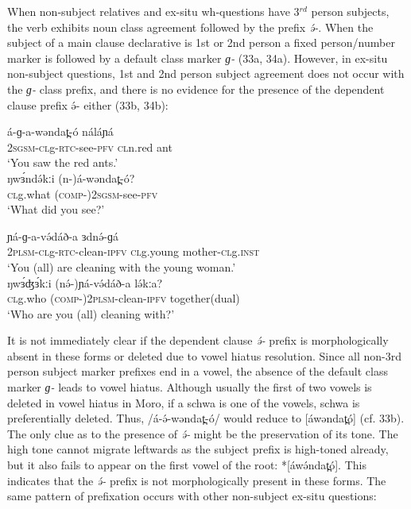 When non-subject relatives and ex-situ wh-questions have 3$^{rd}$ person subjects, the verb exhibits noun class agreement followed by the prefix \textit{ə́-}. When the subject of a main clause declarative is 1st or 2nd person a fixed person/number marker is followed by a default class marker \textit{ɡ-} (33a, 34a). However, in ex-situ non-subject questions, 1st and 2nd person subject agreement does not occur with the \textit{ɡ-} class prefix, and there is no evidence for the presence of the dependent clause prefix ə́- either (33b, 34b):

\ea
\ea \gll	á-ɡ-a-wəndat̪-ó	náláɲá\\
		2\textsc{sgsm-cl}g-\textsc{rtc}-see-\textsc{pfv}	\textsc{cl}n.red ant\\
\trans		‘You saw the red ants.’\\
\ex \gll	ŋwɜ́ndə́kːi	(n-)á-wəndat̪-ó?\\
		\textsc{cl}g.what	(\textsc{comp-})2\textsc{sgsm}-see-\textsc{pfv}\\
\trans		‘What did you see?’   	\\
\z
\z

\ea
\ea	\gll	ɲá-ɡ-a-və́dáð-a	ɜdnə́-ɡá    \\                    
		2\textsc{plsm-cl}g-\textsc{rtc}-clean-\textsc{ipfv}	\textsc{cl}g.young mother-\textsc{cl}g.\textsc{inst}\\
\trans		‘You (all) are cleaning with the young woman.’\\
\ex	\gll	ŋwɜ́ʤɜ́kːi	(nə́-)ɲá-və́dáð-a	lə́kːa?\\
		\textsc{cl}g.who	(\textsc{comp-})2\textsc{plsm}-clean-\textsc{ipfv}	together(dual)\\
\trans		‘Who are you (all) cleaning with?’\\
\z
\z

It is not immediately clear if the dependent clause \textit{ə́-} prefix is morphologically absent in these forms or deleted due to vowel hiatus resolution. Since all non-3rd person subject marker prefixes end in a vowel, the absence of the default class marker \textit{ɡ-} leads to vowel hiatus. Although usually the first of two vowels is deleted in vowel hiatus in Moro, if a schwa is one of the vowels, schwa is preferentially deleted.  Thus, /á-ə́-wəndat̪-ó/ would reduce to [áwəndat̪ó] (cf. 33b). The only clue as to the presence of \textit{ə́-} might be the preservation of its tone. The high tone cannot migrate leftwards as the subject prefix is high-toned already, but it also fails to appear on the first vowel of the root:  *[áwə́ndat̪ó]. This indicates that the \textit{ə́-} prefix is not morphologically present in these forms.
The same pattern of prefixation occurs with other non-subject ex-situ questions:

